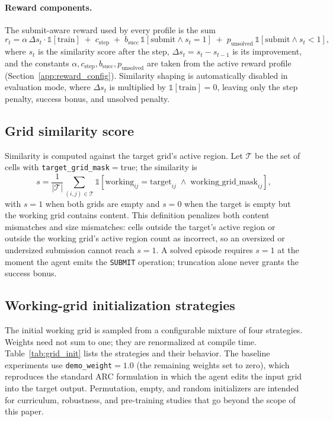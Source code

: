 \paragraph{Reward components.} The submit-aware reward used by every profile is the sum
\begin{equation*}
    r_t = \alpha \,\Delta s_t \cdot \mathbb{1}[\text{train}]\;+\; c_{\text{step}}\;+\; b_{\text{succ}}\,\mathbb{1}[\text{submit} \wedge s_t = 1]\;+\; p_{\text{unsolved}}\,\mathbb{1}[\text{submit} \wedge s_t < 1],
\end{equation*}
where $s_t$ is the similarity score after the step, $\Delta s_t = s_t - s_{t-1}$ is its improvement, and the constants $\alpha, c_{\text{step}}, b_{\text{succ}}, p_{\text{unsolved}}$ are taken from the active reward profile (Section~\ref{app:reward_config}). Similarity shaping is automatically disabled in evaluation mode, where $\Delta s_t$ is multiplied by $\mathbb{1}[\text{train}]=0$, leaving only the step penalty, success bonus, and unsolved penalty.

\subsection{Grid similarity score}
\label{app:similarity}

Similarity is computed against the target grid's active region. Let $\mathcal{T}$ be the set of cells with \texttt{target\_grid\_mask}$=$true; the similarity is
\begin{equation*}
    s = \frac{1}{|\mathcal{T}|}\sum_{(i,j) \in \mathcal{T}} \mathbb{1}\!\left[\text{working}_{ij} = \text{target}_{ij}\;\wedge\;\text{working\_grid\_mask}_{ij}\right],
\end{equation*}
with $s = 1$ when both grids are empty and $s = 0$ when the target is empty but the working grid contains content. This definition penalizes both content mismatches and size mismatches: cells outside the target's active region or outside the working grid's active region count as incorrect, so an oversized or undersized submission cannot reach $s=1$. A solved episode requires $s=1$ at the moment the agent emits the \texttt{SUBMIT} operation; truncation alone never grants the success bonus.

\subsection{Working-grid initialization strategies}
\label{app:grid_init}

The initial working grid is sampled from a configurable mixture of four strategies. Weights need not sum to one; they are renormalized at compile time. Table~\ref{tab:grid_init} lists the strategies and their behavior. The baseline experiments use \texttt{demo\_weight}$=1.0$ (the remaining weights set to zero), which reproduces the standard ARC formulation in which the agent edits the input grid into the target output. Permutation, empty, and random initializers are intended for curriculum, robustness, and pre-training studies that go beyond the scope of this paper.


